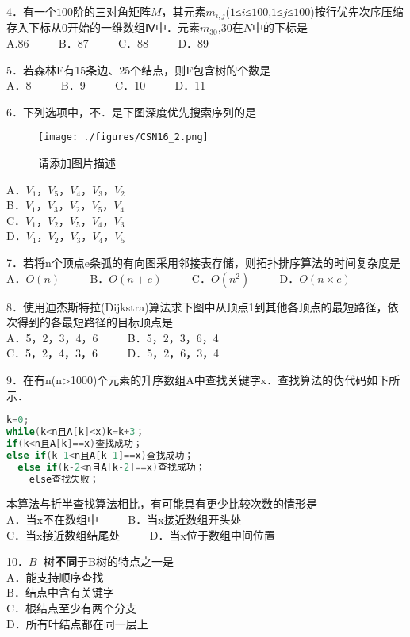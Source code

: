 4．有一个$100$阶的三对角矩阵$M$，其元素$m_{i,j}$($1$≤$i$≤$100$,$1$≤$j$≤$100$)按行优先次序压缩存入下标从$0$开始的一维数组Ⅳ中．元素$m_{30}$,$30$在$N$中的下标是 \\
A.86 $\qquad$ B．87 $\qquad$ C．88 $\qquad$ D．89

5．若森林F有15条边、25个结点，则F包含树的个数是 \\
A．8 $\qquad$ B．9 $\qquad$ C．10 $\qquad$ D．11

6．下列选项中，不．是下图深度优先搜索序列的是 \\
\begin{figure}[ht]
\centering
\texttt{[image: ./figures/CSN16\_2.png]}
\caption{请添加图片描述} \label{CSN16_fig2}
\end{figure}
A．$V_1$，$V_5$，$V_4$，$V_3$，$V_2$ \\
B．$V_1$，$V_3$，$V_2$，$V_5$，$V_4$ \\
C．$V_1$，$V_2$，$V_5$，$V_4$，$V_3$ \\
D．$V_1$，$V_2$，$V_3$，$V_4$，$V_5$

7．若将n个顶点e条弧的有向图采用邻接表存储，则拓扑排序算法的时间复杂度是 \\
A．$O(n)$ $\qquad$ B．$O(n+e)$ $\qquad$ C．$O(n^2)$ $\qquad$ D．$O(n\times e)$

8．使用迪杰斯特拉(Dijkstra)算法求下图中从顶点1到其他各顶点的最短路径，依次得到的各最短路径的目标顶点是 \\
A．5，2，3，4，6 $\qquad$ B．5，2，3，6，4 \\
C．5，2，4，3，6 $\qquad$ D．5，2，6，3，4

9．在有n(n>1000)个元素的升序数组A中查找关键字x．查找算法的伪代码如下所示． \\
\begin{lstlisting}[language=cpp]
k=0;
while(k<n且A[k]<x)k=k+3；
if(k<n且A[k]==x)查找成功；
else if(k-1<n且A[k-1]==x)查找成功；
  else if(k-2<n且A[k-2]==x)查找成功；
    else查找失败；
\end{lstlisting}
本算法与折半查找算法相比，有可能具有更少比较次数的情形是 \\
A．当x不在数组中 $\qquad$ B．当x接近数组开头处 \\
C．当x接近数组结尾处 $\qquad$ D．当x位于数组中间位置

10．$B^+$树\textbf{不同}于B树的特点之一是 \\
A．能支持顺序查找 \\
B．结点中含有关键字 \\
C．根结点至少有两个分支 \\
D．所有叶结点都在同一层上

